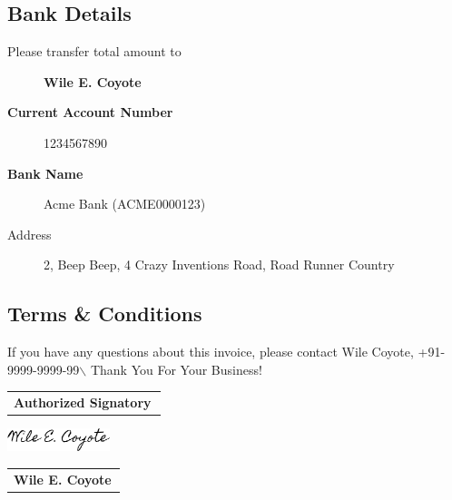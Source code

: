 \documentclass[10pt]{article}
\begin{document}
\subsection{Bank Details}
\label{bank}
\begin{description}
\item[{Please transfer total amount to}] \textbf{Wile E. Coyote}
\item[{\textbf{Current Account Number}       }] 1234567890
\item[{\textbf{Bank Name}   }] Acme Bank (ACME0000123)
\item[{Address}] 2, Beep Beep, 4 Crazy Inventions Road, Road Runner Country
\end{description}
\subsection{Terms \& Conditions}
\label{terms}
If you have any questions about this invoice, please contact Wile Coyote, +91-9999-9999-99$\backslash$
Thank You For Your Business!
\begin{center}
\begin{tabular}{>{\raggedright\arraybackslash}p{0.98\linewidth}}
\textbf{Authorized Signatory}\\
\end{tabular}
\end{center}
\includegraphics[width=3cm]{../assets/signature.png}
\begin{center}
\begin{tabular}{>{\raggedright\arraybackslash}p{0.98\linewidth}}
\textbf{Wile E. Coyote}\\
\end{tabular}
\end{center}
\end{document}
